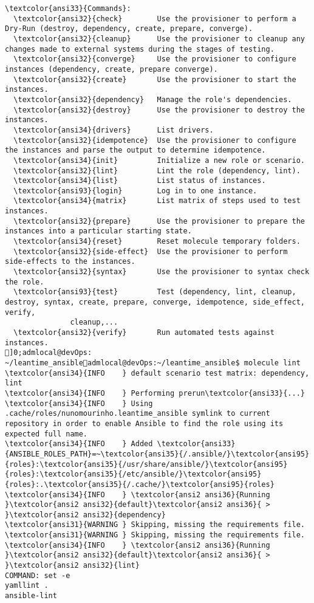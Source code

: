 \documentclass{scrartcl}
\begin{document}
\begin{Verbatim}
\textcolor{ansi33}{Commands}:
  \textcolor{ansi32}{check}        Use the provisioner to perform a Dry-Run (destroy, dependency, create, prepare, converge).
  \textcolor{ansi32}{cleanup}      Use the provisioner to cleanup any changes made to external systems during the stages of testing.
  \textcolor{ansi32}{converge}     Use the provisioner to configure instances (dependency, create, prepare converge).
  \textcolor{ansi32}{create}       Use the provisioner to start the instances.
  \textcolor{ansi32}{dependency}   Manage the role's dependencies.
  \textcolor{ansi32}{destroy}      Use the provisioner to destroy the instances.
  \textcolor{ansi34}{drivers}      List drivers.
  \textcolor{ansi32}{idempotence}  Use the provisioner to configure the instances and parse the output to determine idempotence.
  \textcolor{ansi34}{init}         Initialize a new role or scenario.
  \textcolor{ansi32}{lint}         Lint the role (dependency, lint).
  \textcolor{ansi34}{list}         List status of instances.
  \textcolor{ansi93}{login}        Log in to one instance.
  \textcolor{ansi34}{matrix}       List matrix of steps used to test instances.
  \textcolor{ansi32}{prepare}      Use the provisioner to prepare the instances into a particular starting state.
  \textcolor{ansi34}{reset}        Reset molecule temporary folders.
  \textcolor{ansi32}{side-effect}  Use the provisioner to perform side-effects to the instances.
  \textcolor{ansi32}{syntax}       Use the provisioner to syntax check the role.
  \textcolor{ansi93}{test}         Test (dependency, lint, cleanup, destroy, syntax, create, prepare, converge, idempotence, side_effect, verify,
               cleanup,...
  \textcolor{ansi32}{verify}       Run automated tests against instances.
]0;admlocal@devOps: ~/leantime_ansibleadmlocal@devOps:~/leantime_ansible$ molecule lint
\textcolor{ansi34}{INFO    } default scenario test matrix: dependency, lint
\textcolor{ansi34}{INFO    } Performing prerun\textcolor{ansi33}{...}
\textcolor{ansi34}{INFO    } Using .cache/roles/nunomourinho.leantime_ansible symlink to current repository in order to enable Ansible to find the role using its expected full name.
\textcolor{ansi34}{INFO    } Added \textcolor{ansi33}{ANSIBLE_ROLES_PATH}=~\textcolor{ansi35}{/.ansible/}\textcolor{ansi95}{roles}:\textcolor{ansi35}{/usr/share/ansible/}\textcolor{ansi95}{roles}:\textcolor{ansi35}{/etc/ansible/}\textcolor{ansi95}{roles}:.\textcolor{ansi35}{/.cache/}\textcolor{ansi95}{roles}
\textcolor{ansi34}{INFO    } \textcolor{ansi2 ansi36}{Running }\textcolor{ansi2 ansi32}{default}\textcolor{ansi2 ansi36}{ > }\textcolor{ansi2 ansi32}{dependency}
\textcolor{ansi31}{WARNING } Skipping, missing the requirements file.
\textcolor{ansi31}{WARNING } Skipping, missing the requirements file.
\textcolor{ansi34}{INFO    } \textcolor{ansi2 ansi36}{Running }\textcolor{ansi2 ansi32}{default}\textcolor{ansi2 ansi36}{ > }\textcolor{ansi2 ansi32}{lint}
COMMAND: set -e
yamllint .
ansible-lint


\end{Verbatim}
\end{document}

